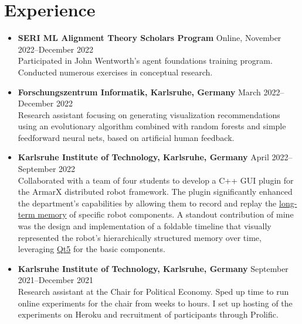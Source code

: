\documentclass[letterpaper,9pt]{article}
\begin{document}
\section{Experience}
\begin{itemize}
	\item \textbf{SERI ML Alignment Theory Scholars Program} \hfill Online, November 2022--December 2022 \\
	      Participated in John Wentworth's agent foundations training program. Conducted numerous exercises in conceptual research.
	\item \textbf{Forschungszentrum Informatik, Karlsruhe, Germany} \hfill March 2022--December 2022 \\
	      Research assistant focusing on generating visualization recommendations using an
	      evolutionary algorithm combined with random forests and simple feedforward neural nets,
	      based on artificial human feedback.
	\item \textbf{Karlsruhe Institute of Technology, Karlsruhe, Germany} \hfill April 2022--September 2022 \\
	      Collaborated with a team of four students to develop a C++ GUI plugin for the
	      ArmarX distributed robot framework. The plugin
	      significantly enhanced the department's capabilities by allowing them to record and replay the
	      \href{https://armarx.humanoids.kit.edu/MemoryX-LongtermMemory.html}{long-term
		      memory} of specific robot components. A standout contribution of mine was the
	      design and implementation of a foldable timeline that visually represented the
	      robot's hierarchically structured memory over time,
	      leveraging \href{https://doc.qt.io/qt-5/}{Qt5} for the basic components.
	\item \textbf{Karlsruhe Institute of Technology, Karlsruhe, Germany} \hfill September 2021--December 2021 \\
	      Research assistant at the Chair for Political Economy. Sped up time to run online experiments for the chair from weeks to hours. I set up hosting of the experiments on Heroku and recruitment of participants through Prolific. %
\end{itemize}

\ifdefined\EAVersion
\end{document}
